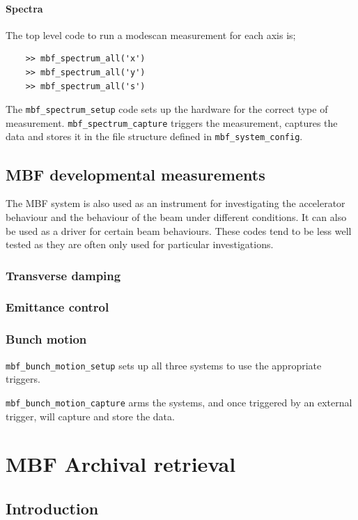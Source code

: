 \documentclass{report}
\begin{document}
\subsubsection{Spectra}
The top level code to run a modescan measurement for each axis is; 
\begin{verbatim}
    >> mbf_spectrum_all('x') 
    >> mbf_spectrum_all('y') 
    >> mbf_spectrum_all('s') 
\end{verbatim}

The \verb|mbf_spectrum_setup| code sets up the hardware for the correct type of measurement. \verb|mbf_spectrum_capture| triggers the measurement, captures the data and stores it in the file structure defined in \verb|mbf_system_config|. 

\section{MBF developmental measurements}
The MBF system is also used as an instrument for investigating the accelerator behaviour and the behaviour of the beam under different conditions. It can also be used as a driver for certain beam behaviours. These codes tend to be less well tested as they are often only used for particular investigations.
\subsection{Transverse damping}
\subsection{Emittance control}
\subsection{Bunch motion}
 \verb|mbf_bunch_motion_setup| sets up all three systems to use the appropriate triggers. 
 
 \verb|mbf_bunch_motion_capture| arms the systems, and once triggered by an external trigger, will capture and store the data.

\chapter{MBF Archival retrieval}

\section{Introduction}
\end{document}
